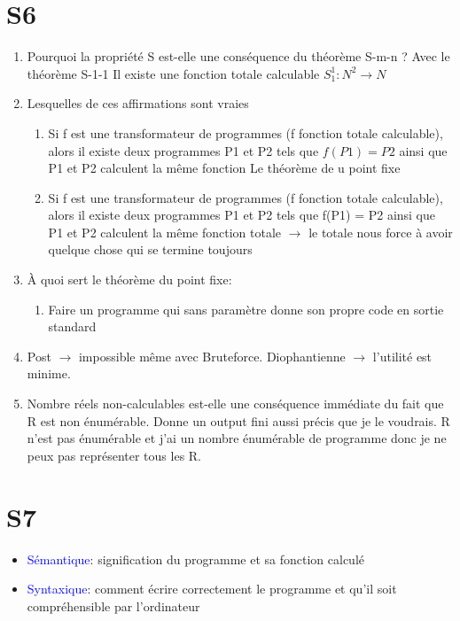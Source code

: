 \documentclass{report}
\begin{document}
\section{S6}
\begin{enumerate}
\item Pourquoi la propriété S est-elle une conséquence du théorème S-m-n ? Avec le théorème S-1-1 Il existe une fonction totale calculable $S_1^1:N^2\rightarrow N$
\item Lesquelles de ces affirmations sont vraies
\begin{enumerate}
	\item Si f est une transformateur de programmes (f fonction totale calculable), alors il existe deux programmes P1 et P2 tels que $f(P1) = P2$ ainsi que P1 et P2 calculent la même fonction  Le théorème de u point fixe
	\item Si f est une transformateur de programmes (f fonction totale calculable), alors il existe deux programmes P1 et P2 tels que f(P1) = P2 ainsi que P1 et P2 calculent la même fonction totale $\rightarrow$ le totale nous force à avoir quelque chose qui se termine toujours
\end{enumerate}
\item À quoi sert le théorème du point fixe:
\begin{enumerate}
\item Faire un programme qui sans paramètre donne son propre code en sortie standard
\end{enumerate}
\item Post $\rightarrow$ impossible même avec Bruteforce. Diophantienne $\rightarrow$ l'utilité est minime.
\item Nombre réels non-calculables est-elle une conséquence immédiate du fait que R est non énumérable.
Donne un output fini aussi précis que je le voudrais. R n'est pas énumérable et j'ai un nombre énumérable de programme donc je ne peux pas représenter tous les R.
\end{enumerate}

\section{S7}
\begin{itemize}
\item \textcolor{blue}{Sémantique}: signification du programme et sa fonction calculé
\item \textcolor{blue}{Syntaxique}: comment écrire correctement le programme et qu'il soit compréhensible par l'ordinateur
\end{itemize}
\end{document}
